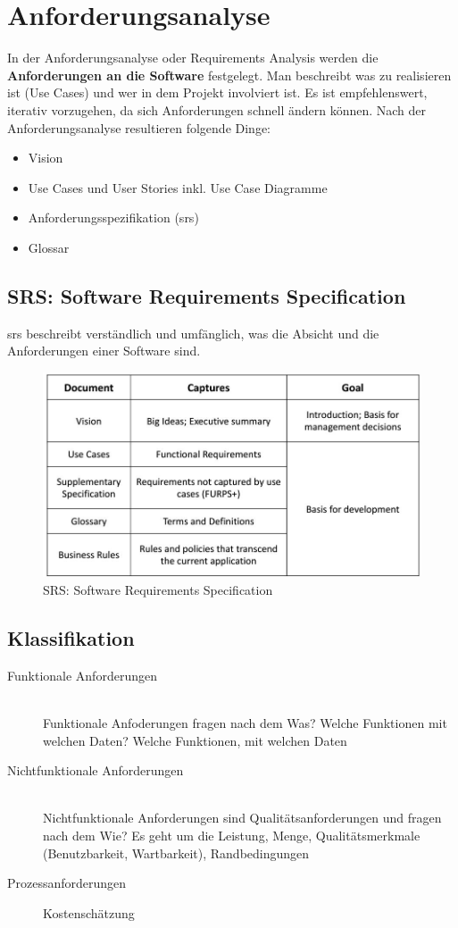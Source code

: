 \section{Anforderungsanalyse}
In der Anforderungsanalyse oder Requirements Analysis werden die \textbf{Anforderungen an die Software} festgelegt. Man beschreibt was zu realisieren ist (Use Cases) und wer in dem Projekt involviert ist. Es ist empfehlenswert, iterativ vorzugehen, da sich Anforderungen schnell ändern können. Nach der Anforderungsanalyse resultieren folgende Dinge:
\begin{itemize}
	\item Vision
	\item Use Cases und User Stories inkl. Use Case Diagramme
	\item Anforderungsspezifikation (\gls{srs})
	\item Glossar
\end{itemize}


\subsection{SRS: Software Requirements Specification}
\gls{srs} beschreibt verständlich und umfänglich, was die Absicht und die Anforderungen einer Software sind.
\begin{figure}[h]
	\centering
	\includegraphics[width=0.7\linewidth]{images/srs_requirements}
	\caption{SRS: Software Requirements Specification}
	\label{fig:srsrequirements}
\end{figure}

\subsection{Klassifikation}
\begin{description}
	\item[Funktionale Anforderungen] \hfill \\
	Funktionale Anfoderungen fragen nach dem Was? Welche Funktionen mit welchen Daten?
	Welche Funktionen, mit welchen Daten
	\item[Nichtfunktionale Anforderungen] \hfill \\
	Nichtfunktionale Anforderungen sind Qualitätsanforderungen und fragen nach dem Wie? Es geht um die Leistung, Menge, Qualitätsmerkmale (Benutzbarkeit, Wartbarkeit), Randbedingungen
	\item[Prozessanforderungen] Kostenschätzung
\end{description}

